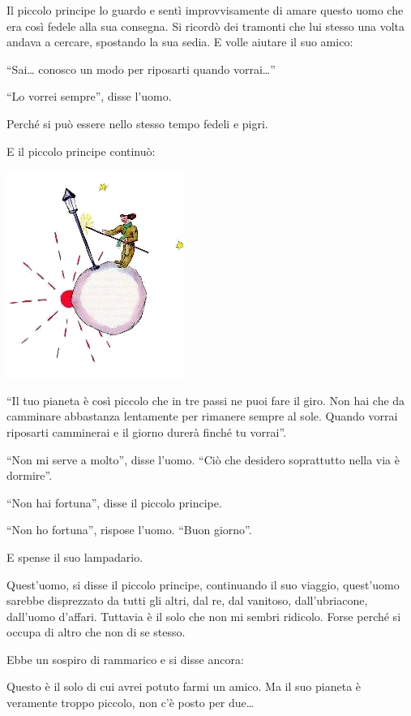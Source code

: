 \documentclass[11pt]{scrbook}
\begin{document}
Il piccolo principe lo guardo e sentì improvvisamente di amare questo
uomo che era così fedele alla sua consegna. Si ricordò dei tramonti che
lui stesso una volta andava a cercare, spostando la sua sedia. E volle
aiutare il suo amico:

``Sai\ldots{} conosco un modo per riposarti quando vorrai\ldots{}''

``Lo vorrei sempre'', disse l'uomo.

Perché si può essere nello stesso tempo fedeli e pigri.

E il piccolo principe continuò:

\begin{center}
\includegraphics{img/14a}
\end{center}

``Il tuo pianeta è così piccolo che in tre passi ne puoi fare il giro.
Non hai che da camminare abbastanza lentamente per rimanere sempre al
sole. Quando vorrai riposarti camminerai e il giorno durerà finché tu
vorrai''.

``Non mi serve a molto'', disse l'uomo. ``Ciò che desidero soprattutto
nella via è dormire''.

``Non hai fortuna'', disse il piccolo principe.

``Non ho fortuna'', rispose l'uomo. ``Buon giorno''.

E spense il suo lampadario.

Quest'uomo, si disse il piccolo principe, continuando il suo viaggio,
quest'uomo sarebbe disprezzato da tutti gli altri, 
dal re, dal vanitoso, dall'ubriacone, dall'uomo d'affari. Tuttavia è il
solo che non mi sembri ridicolo. Forse perché si occupa di altro che non
di se stesso.

Ebbe un sospiro di rammarico e si disse ancora:

Questo è il solo di cui avrei potuto farmi un amico. Ma il suo pianeta è
veramente troppo piccolo, non c'è posto per due\ldots{}
\end{document}
